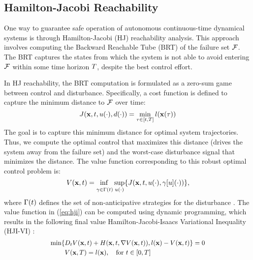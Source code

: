 \subsection{\label{background_hj}Hamilton-Jacobi Reachability}

One way to guarantee safe operation of autonomous continuous-time dynamical systems is through Hamilton-Jacobi (HJ) reachability analysis. This approach involves computing the Backward Reachable Tube (BRT) of the failure set $\mathcal{F}$. The BRT captures the states from which the system is not able to avoid entering $\mathcal{F}$ within some time horizon $T$, despite the best control effort.

In HJ reachability, the BRT computation is formulated as a zero-sum game between control and disturbance. Specifically, a cost function is defined to capture the minimum distance to $\mathcal{F}$ over time:
% 
\begin{equation}
J(\mathbf{x}, t, u(\cdot), d(\cdot))=\min _{\tau \in[t, T]} l (\mathbf{x}(\tau))
\end{equation}
% 
The goal is to capture this minimum distance for optimal system trajectories. Thus, we compute the optimal control that maximizes this distance (drives the system away from the failure set) and the worst-case disturbance signal that minimizes the distance. The value function corresponding to this robust optimal control problem is:
% 
\begin{equation}\label{eq:hji}
 \vfunc(\state, \tvar)=\adjustlimits\inf_{\strat \in \stratset(\tvar)} \sup_{\cfunc} \{\costfunctional(\state, \tvar, \cfunc, \strat[\ctrl](\cdot))\},
\end{equation}
% 
where $\Gamma(t)$ defines the set of non-anticipative strategies for the disturbance \cite{bansal2017hamilton}.
The value function in (\ref{eq:hji}) can be computed using dynamic programming, which results in the following final value Hamilton-Jacobi-Isaacs Variational Inequality (HJI-VI) \cite{bansal2017hamilton,lygeros2004reachability,mitchell2005time}:
% 
\begin{equation} \label{eq:pde}\fontsize{9.5}{10}\selectfont
    \begin{aligned}
    \min \{&D_{\tvar} \vfunc(\state, \tvar) + \ham(\state, \tvar, \nabla \vfunc(\state, \tvar)), \targetfunc(\state) - \vfunc(\state, \tvar) \} = 0 \\
    &\vfunc(\state, \horizon) = \targetfunc(\state), \quad \text{for} \ \tvar \in \left[\tinit, \horizon\right]
    \end{aligned}
\end{equation}
